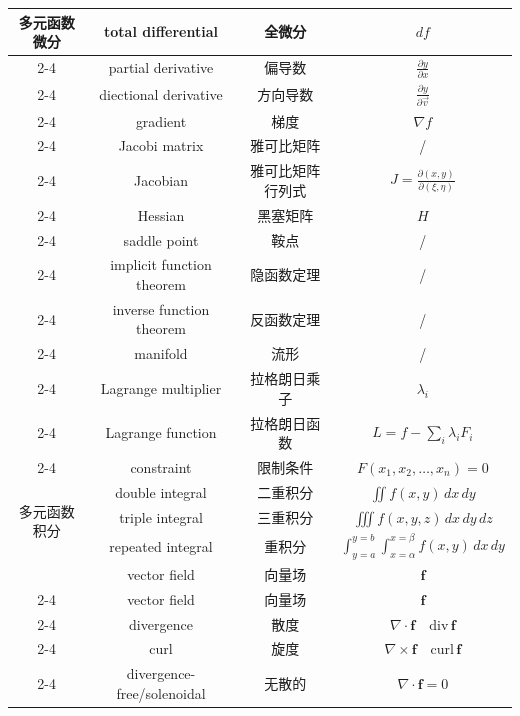 \documentclass{article}
\begin{document}
\begin{longtable}{|c|c|c|c|}
    \multirow{14}{*}{多元函数微分}
    & total differential & 全微分 & $df$ \\
    \cline{2-4} 
    & partial derivative & 偏导数 & $\frac{\partial y}{\partial x}$ \\
    \cline{2-4}
    & diectional derivative & 方向导数 & $\frac{\partial y}{\partial \vec{v}}$ \\
    \cline{2-4}
    & gradient & 梯度 & $\nabla f$ \\
    \cline{2-4}
    & Jacobi matrix & 雅可比矩阵 & / \\
    \cline{2-4}
    & Jacobian & 雅可比矩阵行列式 & $J=\frac{\partial (x,y)}{\partial (\xi,\eta)}$ \\
    \cline{2-4}
    & Hessian & 黑塞矩阵 & $H$ \\
    \cline{2-4}
    & saddle point & 鞍点 & / \\
    \cline{2-4}
    & implicit function theorem & 隐函数定理 & / \\
    \cline{2-4}
    & inverse function theorem & 反函数定理 & / \\
    \cline{2-4}
    & manifold & 流形 & / \\
    \cline{2-4}
    & Lagrange multiplier & 拉格朗日乘子 & $\lambda_i$ \\
    \cline{2-4}
    & Lagrange function & 拉格朗日函数 & $L=f-\sum\limits_{i}\lambda_iF_i$ \\
    \cline{2-4}
    & constraint & 限制条件 & $F(x_1,x_2,\dots,x_n)=0$ \\
    \hline
    \multirow{3}{*}{多元函数积分}
    & double integral & 二重积分 & $\iint f(x,y)\,dx\,dy$ \\
    \cline{2-4}
    & triple integral & 三重积分 & $\iiint f(x,y,z)\,dx\,dy\,dz$ \\
    \cline{2-4}
    & repeated integral & 重积分 & $\int_{y=a}^{y=b}\int_{x=\alpha}^{x=\beta}f(x,y)\,dx\,dy$ \\
    \hline
    & vector field & 向量场 & $\boldsymbol{f}$ \\
    \cline{2-4}
    \multirow{15}{*}{矢量微积分}
    & vector field & 向量场 & $\boldsymbol{f}$ \\
    \cline{2-4}
    & divergence & 散度 & $\nabla \cdot \boldsymbol{f} \quad \text{div}\, \boldsymbol{f}$\\
    \cline{2-4}
    & curl & 旋度 & $\nabla \times \boldsymbol{f} \quad \text{curl}\, \boldsymbol{f}$ \\
    \cline{2-4}
    & divergence-free/solenoidal & 无散的 & $\nabla \cdot \boldsymbol{f} = 0$ \\

\end{longtable}
\end{document}
